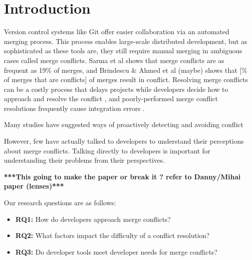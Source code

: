 \section{Introduction}\label{introduction}



Version control systems like Git offer easier collaboration via an automated merging process. This process enables large-scale distributed development, but as sophisticated as these tools are, they still require manual merging in ambiguous cases called merge conflicts. Sarma et al \cite{cassandra} shows that merge conflicts are as frequent as 19\% of merges, and Brindescu \& Ahmed et al (maybe) shows that [\% of merges that are conflicts] of merges result in conflict. Resolving merge conflicts can be a costly process that delays projects while developers decide how to approach and resolve the conflict \cite{cassandra}, and poorly-performed merge conflict resolutions frequently cause integration errors \cite{bird-branches-conflict}. 


Many studies have suggested ways of proactively detecting and avoiding conflict \cite{Brun2011} \cite{palantir} 


However, few have actually talked to developers to understand their perceptions about merge conflicts. Talking directly to developers is important for understanding their problems from their perspectives.

\textbf{***This going to make the paper or break it ? refer to Danny/Mihai paper (lenses)***}

Our research questions are as follows:
\begin{itemize}
\item\textbf{RQ1:} How do developers approach merge conflicts?\\
\item\textbf{RQ2:} What factors impact the difficulty of a conflict resolution?\\
\item\textbf{RQ3:} Do developer tools meet developer needs for merge conflicts?\\
\end{itemize}